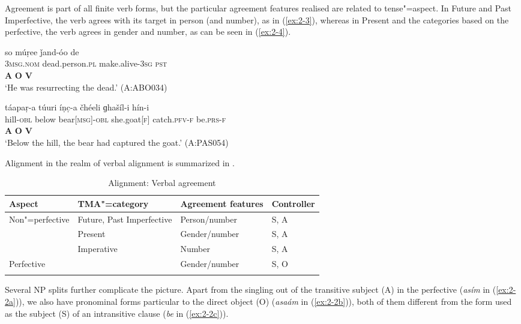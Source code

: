 Agreement is part of all finite verb forms, but the particular agreement features realised are related to tense"=aspect. In Future and Past Imperfective, the verb agrees with its target in person (and number), as in (\ref{ex:2-3}), whereas in Present and the categories based on the perfective, the verb agrees in gender and number, as can be seen in (\ref{ex:2-4}).

\begin{exe}
\ex
\label{ex:2-3}
\glll so múṛee ǰand-óo de \\
\textsc{3msg.nom} dead.person.\textsc{pl} make.alive-\textsc{3sg} \textsc{pst} \\
\textbf{A} \textbf{O} \textbf{V} \\
\glt `He was resurrecting the dead.' (A:ABO034)
\end{exe}

\begin{exe}
\ex
\label{ex:2-4}
\glll táapaṛ-a túuri íṇc̣-a čhéeli ɡhašíl-i hín-i \\ 
hill-\textsc{obl} below bear[\textsc{msg}]-\textsc{obl} she.goat[\textsc{f}] catch.\textsc{pfv-f} be.\textsc{prs-f} \\
{} {} \textbf{A} \textbf{O} \textbf{V} \\
\glt `Below the hill, the bear had captured the goat.' (A:PAS054)
\end{exe}


Alignment in the realm of verbal alignment is summarized in . 


\begin{table}[ht]
\caption{Alignment: Verbal agreement}
\begin{tabularx}{\textwidth}{ l l Q Q }
\lsptoprule
Aspect &
TMA"=category &
Agreement features &
Controller \\\hline
Non"=perfective &
Future, Past Imperfective &
Person/number &
S, A \\
&
Present &
Gender/number &
S, A \\
&
Imperative &
Number &
S, A \\
Perfective &
&
Gender/number &
S, O \\\lspbottomrule
\end{tabularx}
\label{tab:2-verbagr}
\end{table}


Several NP splits further complicate the picture. Apart from the singling out of the transitive subject (A) in the perfective (\textit{asím} in (\ref{ex:2-2a})), we also have pronominal forms particular to the direct object (O) (\textit{asaám} in (\ref{ex:2-2b})), both of them different from the form used as the subject (S) of an intransitive clause (\textit{be} in (\ref{ex:2-2c})).

